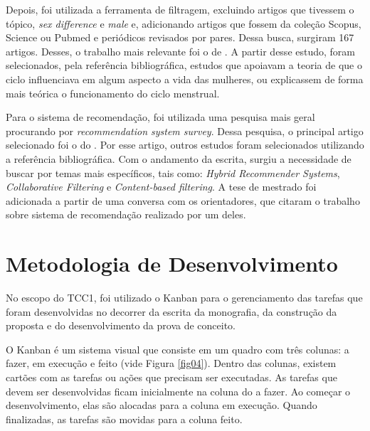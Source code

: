 Depois, foi utilizada a ferramenta de filtragem, excluindo artigos que tivessem o tópico, \emph{sex difference} e \emph{male}
 e, adicionando artigos que fossem da coleção Scopus, Science ou Pubmed e periódicos revisados por pares. Dessa busca, surgiram 167 artigos.
Desses, o trabalho mais relevante foi o de . A partir desse estudo, foram selecionados, pela referência bibliográfica, estudos que apoiavam 
a teoria de que o ciclo influenciava em algum aspecto a vida das mulheres, ou explicassem de forma mais teórica o funcionamento do ciclo menstrual.


Para o sistema de recomendação, foi utilizada uma pesquisa mais geral procurando por \emph{recommendation system survey}. Dessa pesquisa, o principal artigo selecionado foi o 
do . Por esse artigo, outros estudos foram selecionados utilizando a referência bibliográfica. Com o andamento da escrita, surgiu a necessidade de buscar
por temas mais específicos, tais como: \emph{Hybrid Recommender Systems}, \emph{Collaborative Filtering} e \emph{Content-based filtering}. A tese de mestrado \cite{mauricio} foi adicionada a partir 
de uma conversa com os orientadores, que citaram o trabalho sobre sistema de recomendação realizado por um deles.


\section{Metodologia de Desenvolvimento}

No escopo do TCC1, foi utilizado o Kanban para o gerenciamento das tarefas que foram 
desenvolvidas no decorrer da escrita da monografia, da construção da proposta e do desenvolvimento 
da prova de conceito.

O Kanban é um sistema visual que consiste em um quadro com três colunas: a fazer, em execução e feito (vide Figura \ref{fig04}). 
Dentro das colunas, existem cartões com as tarefas ou ações que precisam ser executadas. As tarefas que devem 
ser desenvolvidas ficam inicialmente na coluna do a fazer. Ao começar o desenvolvimento, elas são alocadas para a coluna 
em execução. Quando finalizadas, as tarefas são movidas para a coluna feito.

